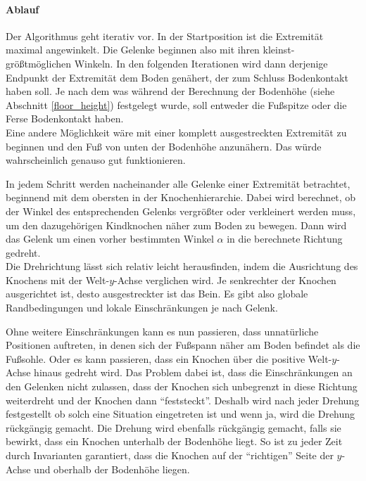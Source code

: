 \paragraph{Ablauf}
Der Algorithmus geht iterativ vor.
In der Startposition ist die Extremität maximal angewinkelt. Die Gelenke beginnen also mit ihren kleinst- \bzw größtmöglichen Winkeln. In den folgenden Iterationen wird dann derjenige Endpunkt der Extremität dem Boden genähert, der zum Schluss Bodenkontakt haben soll. Je nach dem was während der Berechnung der Bodenhöhe (siehe Abschnitt \ref{floor_height}) festgelegt wurde, soll entweder die Fußspitze oder die Ferse Bodenkontakt haben.\\
Eine andere Möglichkeit wäre mit einer komplett ausgestreckten Extremität zu beginnen und den Fuß von unten der Bodenhöhe anzunähern. Das würde wahrscheinlich genauso gut funktionieren.

In jedem Schritt werden nacheinander alle Gelenke einer Extremität betrachtet, beginnend mit dem obersten in der Knochenhierarchie. Dabei wird berechnet, ob der Winkel des entsprechenden Gelenks vergrößter oder verkleinert werden muss, um den dazugehörigen Kindknochen näher zum Boden zu bewegen. Dann wird das Gelenk um einen vorher bestimmten Winkel $\alpha$ in die berechnete Richtung gedreht.\\
Die Drehrichtung lässt sich relativ leicht herausfinden, indem die Ausrichtung des Knochens mit der Welt-$y$-Achse verglichen wird. Je senkrechter der Knochen ausgerichtet ist, desto ausgestreckter ist das Bein.
Es gibt also globale Randbedingungen und lokale Einschränkungen je nach Gelenk. %

Ohne weitere Einschränkungen kann es nun passieren, dass unnatürliche Positionen auftreten, in denen sich \zb der Fußspann näher am Boden befindet als die Fußsohle.
Oder es kann passieren, dass ein Knochen über die positive Welt-$y$-Achse hinaus gedreht wird. Das Problem dabei ist, dass die Einschränkungen an den Gelenken nicht zulassen, dass der Knochen sich unbegrenzt in diese Richtung weiterdreht und der Knochen dann "`feststeckt"'. Deshalb wird nach jeder Drehung festgestellt ob solch eine Situation eingetreten ist und wenn ja, wird die Drehung rückgängig gemacht.
Die Drehung wird ebenfalls rückgängig gemacht, falls sie bewirkt, dass ein Knochen unterhalb der Bodenhöhe liegt.
So ist zu jeder Zeit durch Invarianten garantiert, dass die Knochen auf der "`richtigen"' Seite der $y$-Achse und oberhalb der Bodenhöhe liegen.

